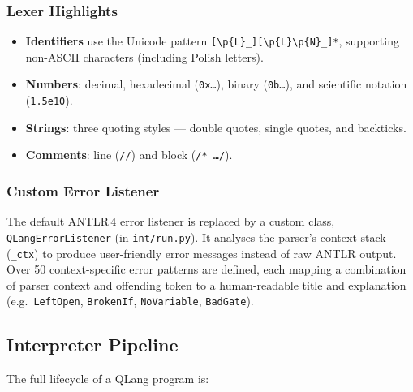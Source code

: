 \subsubsection{Lexer Highlights}

\begin{itemize}
    \item \textbf{Identifiers} use the Unicode pattern
          \texttt{[\textbackslash p\{L\}\_][\textbackslash p\{L\}\textbackslash p\{N\}\_]*},
          supporting non-ASCII characters (including Polish letters).
    \item \textbf{Numbers}: decimal, hexadecimal (\texttt{0x\ldots}),
          binary (\texttt{0b\ldots}), and scientific notation
          (\texttt{1.5e10}).
    \item \textbf{Strings}: three quoting styles --- double quotes, single
          quotes, and backticks.
    \item \textbf{Comments}: line (\texttt{//}) and block
          (\texttt{/* \ldots */}).
\end{itemize}

\subsubsection{Custom Error Listener}

The default ANTLR\,4 error listener is replaced by a custom class,
\texttt{QLangErrorListener} (in \texttt{int/run.py}).  It analyses the
parser's context stack (\texttt{\_ctx}) to produce user-friendly error
messages instead of raw ANTLR output.  Over 50 context-specific error
patterns are defined, each mapping a combination of parser context and
offending token to a human-readable title and explanation (e.g.\
\texttt{LeftOpen}, \texttt{BrokenIf}, \texttt{NoVariable},
\texttt{BadGate}).

\subsection{Interpreter Pipeline}
\label{sec:impl-pipeline}

The full lifecycle of a QLang program is:

